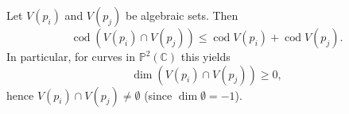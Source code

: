 Let $V(p_i)$ and $V(p_j)$ be algebraic sets. Then
$$\operatorname{cod}(V(p_i) \cap V(p_j)) \leqslant \operatorname{cod} V(p_i) + \operatorname{cod} V(p_j).$$
In particular, for curves in $\mathbb{P}^2(\mathbb{C})$ this yields
$$\dim(V(p_i) \cap V(p_j)) \geqslant 0,$$
hence $V(p_i) \cap V(p_j) \neq \emptyset$ (since $\dim \emptyset = -1$).
